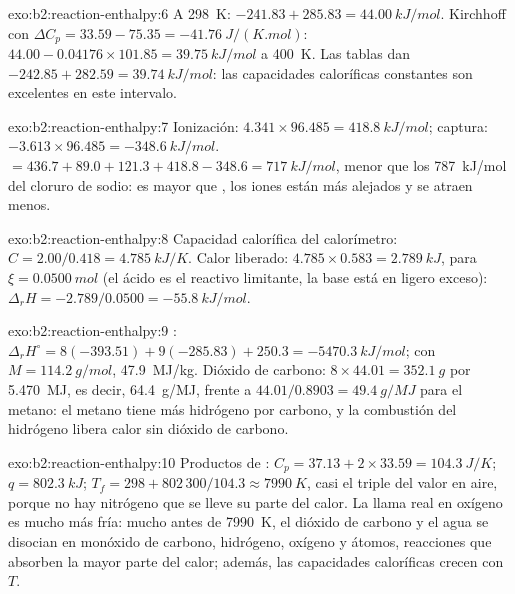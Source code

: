 \begin{solution}{exo:b2:reaction-enthalpy:6}
A \qty{298}{K}: $-241.83 + 285.83 = \qty{44.00}{kJ/mol}$. Kirchhoff con
$\Delta C_p = 33.59 - 75.35 = \qty{-41.76}{J/(K.mol)}$:
$44.00 - 0.04176 \times 101.85 = \qty{39.75}{kJ/mol}$ a \qty{400}{K}. Las
tablas dan $-242.85 + 282.59 = \qty{39.74}{kJ/mol}$: las capacidades
caloríficas constantes son excelentes en este intervalo.
\end{solution}

\begin{solution}{exo:b2:reaction-enthalpy:7}
Ionización: $4.341 \times 96.485 = \qty{418.8}{kJ/mol}$; captura:
$-3.613 \times 96.485 = \qty{-348.6}{kJ/mol}$.  $= 436.7 +
89.0 + 121.3 + 418.8 - 348.6 = \qty{717}{kJ/mol}$, menor que los
\qty{787}{kJ/mol} del cloruro de sodio:  es mayor que , los
iones están más alejados y se atraen menos.
\end{solution}

\begin{solution}{exo:b2:reaction-enthalpy:8}
Capacidad calorífica del calorímetro: $C = 2.00/0.418 = \qty{4.785}{kJ/K}$.
Calor liberado: $4.785 \times 0.583 = \qty{2.789}{kJ}$, para $\xi =
\qty{0.0500}{mol}$ (el ácido es el reactivo limitante, la base está en ligero exceso):
$\Delta_r H = -2.789/0.0500 = \qty{-55.8}{kJ/mol}$.
\end{solution}

\begin{solution}{exo:b2:reaction-enthalpy:9}
: $\Delta_r H^\circ =
8(-393.51) + 9(-285.83) + 250.3 = \qty{-5470.3}{kJ/mol}$; con $M =
\qty{114.2}{g/mol}$, \qty{47.9}{MJ/kg}. Dióxido de carbono: $8 \times 44.01 =
\qty{352.1}{g}$ por \qty{5.470}{MJ}, es decir, \qty{64.4}{g/MJ}, frente a
$44.01/0.8903 = \qty{49.4}{g/MJ}$ para el metano: el metano tiene más hidrógeno por
carbono, y la combustión del hidrógeno libera calor sin dióxido de carbono.
\end{solution}

\begin{solution}{exo:b2:reaction-enthalpy:10}
Productos de : $C_p = 37.13 + 2 \times 33.59 =
\qty{104.3}{J/K}$; $q = \qty{802.3}{kJ}$; $T_f = 298 + 802\,300/104.3 \approx
\qty{7990}{K}$, casi el triple del valor en aire, porque no hay nitrógeno
que se lleve su parte del calor. La llama real en oxígeno es mucho más fría: mucho antes de \qty{7990}{K}, el dióxido de carbono y el agua
se disocian en monóxido de carbono, hidrógeno, oxígeno y átomos, reacciones
 que absorben la mayor parte del calor; además, las capacidades caloríficas crecen con
$T$.
\end{solution}

